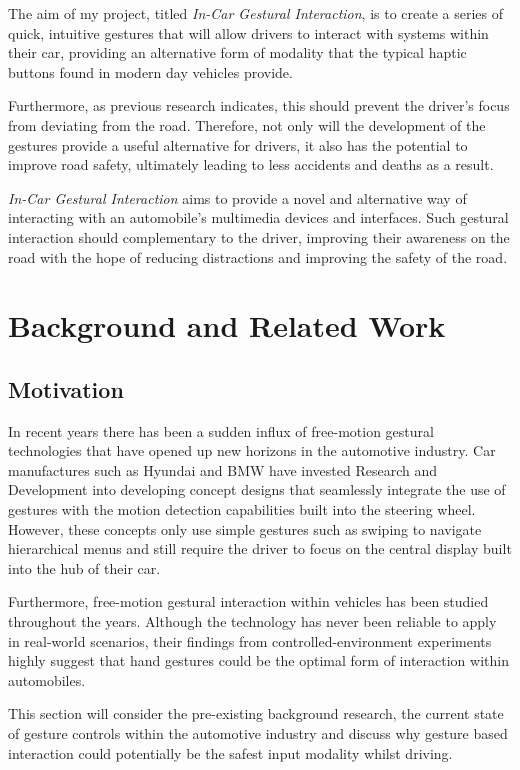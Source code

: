 \documentclass{l4proj}
\begin{document}
The aim of my project, titled {\it In-Car Gestural Interaction}, is to create a series of quick, intuitive gestures that will allow drivers to interact with systems within their car, providing an alternative form of modality that the typical haptic buttons found in modern day vehicles provide. 

Furthermore, as previous research indicates, this should prevent the driver’s focus from deviating from the road.  Therefore, not only will the development of the gestures provide a useful alternative for drivers, it also has the potential to improve road safety, ultimately leading to less accidents and deaths as a result. 

{\it In-Car Gestural Interaction} aims to provide a novel and alternative way of interacting with an automobile’s multimedia devices and interfaces. Such gestural interaction should complementary to the driver, improving their awareness on the road with the hope of reducing distractions and improving the safety of the road. 


\chapter{Background and Related Work}
\label{sec:back}
\vspace{-3mm}
\section{Motivation}
\vspace{-3mm}
In recent years there has been a sudden influx of free-motion gestural technologies that have opened up new horizons in the automotive industry. Car manufactures such as Hyundai and BMW have invested Research and Development into developing concept designs that seamlessly integrate the use of gestures with the motion detection capabilities built into the steering wheel. However, these concepts only use simple gestures such as swiping to navigate hierarchical menus and still require the driver to focus on the central display built into the hub of their car.

Furthermore, free-motion gestural interaction within vehicles has been studied throughout the years. Although the technology has never been reliable to apply in real-world scenarios, their findings from controlled-environment experiments highly suggest that hand gestures could be the optimal form of interaction within automobiles.

This section will consider the pre-existing background research, the current state of gesture controls within the automotive industry and discuss why gesture based interaction could potentially be the safest input modality whilst driving.  
\end{document}
